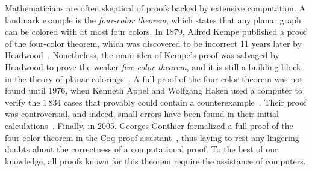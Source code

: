 Mathematicians are often skeptical of proofs backed by extensive computation.
A landmark example is the \emph{four-color theorem}, which states that any planar graph can be colored with at most four colors. 
In 1879, Alfred Kempe published a proof of the four-color theorem, which was discovered to be incorrect 11 years later by Headwood~\cite{Walters2004ItAT,Wilson2002GraphsCA}. 
Nonetheless, the main idea of Kempe's proof was salvaged by Headwood to prove the weaker \emph{five-color theorem}, and it is still a building block in the theory of planar colorings~\cite{Walters2004ItAT}. 
A full proof of the four-color theorem was not found until 1976, when Kenneth Appel and Wolfgang Haken used a computer to verify the 1\,834 cases that provably could contain a counterexample~\cite{appelFourColorProblem1978}.
Their proof was controversial, and indeed, small errors have been found in their initial calculations~\cite{Walters2004ItAT,Wilson2002GraphsCA}.
Finally, in 2005, Georges Gonthier formalized a full proof of the four-color theorem in the \textsf{Coq} proof assistant~\cite{gonthierFourColourTheorem2008a}, thus laying to rest any lingering doubts about the correctness of a computational proof. To the best of our knowledge, all proofs known for this theorem require the assistance of computers.

